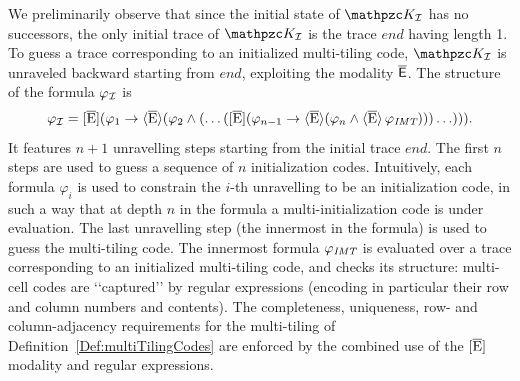 We preliminarily  observe that  since the initial state of $\Ku_\Instance$ has no successors, the only initial trace of $\Ku_\Instance$ is the trace $end$ having length 1. To guess a trace corresponding to an initialized multi-tiling code, $\Ku_\Instance$ is unraveled backward starting from $end$, exploiting the modality $\mathsf{\overline{E}}$. The structure of the formula $\varphi_{\mathcal{I}}$ is 
\[
\varphi_{\mathcal{I}}= \operatorname{\mathopen[ \overline{E} \mathclose]}(\varphi_1 \rightarrow \operatorname{\langle \overline{E}\rangle}(\varphi_2\wedge(\ldots (\operatorname{\mathopen[ \overline{E} \mathclose]}(\varphi_{n-1} \rightarrow \operatorname{\langle \overline{E}\rangle}(\varphi_n\wedge \operatorname{\langle \overline{E}\rangle} \varphi_{\textit{IMT}})))\ldots))).
\]
It features $n+1$ unravelling steps starting from the initial trace $end$. The first $n$ steps are used to guess a sequence of $n$ initialization codes. Intuitively, each formula $\varphi_i$ is used to constrain 
the $i$-th unravelling to be an initialization code, in such a way that at depth $n$ in the formula a multi-initialization code is under evaluation. 
The last unravelling step (the innermost in the formula) is used to guess the multi-tiling code. The innermost formula $\varphi_{\textit{IMT}}$ is evaluated over a trace corresponding to an initialized multi-tiling code, and checks its structure: 
multi-cell codes are \lq\lq captured\rq\rq{} by regular expressions (encoding in particular their row and column numbers and contents).
The completeness, uniqueness, row- and column-adjacency requirements for the multi-tiling of Definition~\ref{Def:multiTilingCodes} are enforced by the combined use of the $\operatorname{\mathopen[ \overline{E} \mathclose]}$ modality and regular expressions.

